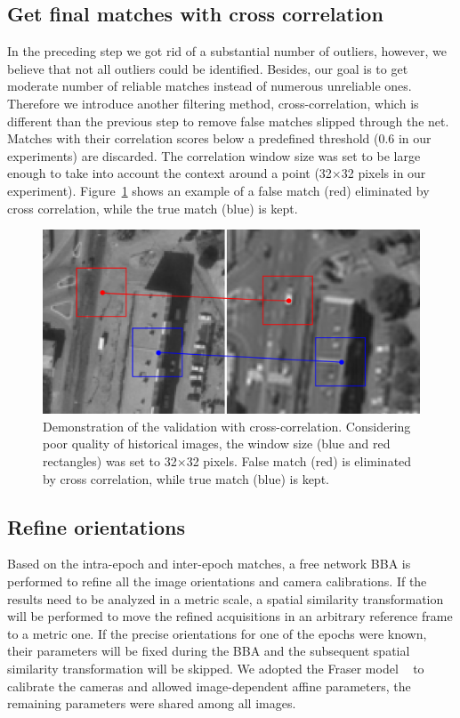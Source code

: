 \subsection{Get final matches with cross correlation}
In the preceding step we got rid of a substantial number of outliers, however, we believe that not all outliers could be identified. 
Besides, our goal is to get moderate number of reliable matches instead of numerous unreliable ones. Therefore we introduce another filtering method, cross-correlation, which is different than the previous step to remove false matches slipped through the net. Matches with their correlation scores below a predefined threshold (0.6 in our experiments) are discarded. The correlation window size was set to be large enough to take into account the context around a point (32$\times$32 pixels in our experiment). Figure~\ref{crossc} shows an example of a false match (red) eliminated by cross correlation, while the true match (blue) is kept.
\begin{figure}[htbp]
	\begin{center}
		\includegraphics[width=0.8\columnwidth]{images/Chapitre4/tiept.png}
		\caption{Demonstration of the validation with cross-correlation. Considering poor quality of historical images, the window size (blue and red rectangles) was set to 32$\times$32 pixels. False match (red) is eliminated by cross correlation, while true match (blue) is kept.}
		\label{crossc}
	\end{center}
\end{figure}

\subsection{Refine orientations}
Based on the intra-epoch and inter-epoch matches, a free network \ac{BBA} is performed to refine all the image orientations and camera calibrations. If the results need to be analyzed in a metric scale, a spatial similarity transformation will be performed to move the refined acquisitions in an arbitrary reference frame to a metric one. If the precise orientations for one of the epochs were known, their parameters will be fixed during the \ac{BBA} and the subsequent spatial similarity transformation will be skipped.
We adopted the Fraser model ~\cite{fraser1997digital} to calibrate the cameras and allowed image-dependent affine parameters, the remaining parameters were shared among all images.


